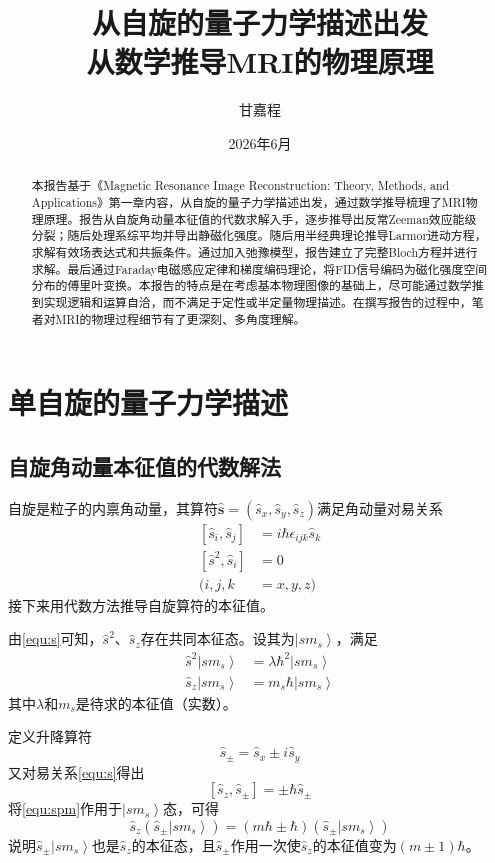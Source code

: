 \documentclass[12pt]{article}
\title{从自旋的量子力学描述出发\\从数学推导MRI的物理原理}
\author{甘嘉程}
\date{2026年6月}
\begin{document}
\maketitle

\begin{abstract}
本报告基于《Magnetic Resonance Image Reconstruction: Theory, Methods, and Applications》第一章内容，从自旋的量子力学描述出发，通过数学推导梳理了MRI物理原理。报告从自旋角动量本征值的代数求解入手，逐步推导出反常Zeeman效应能级分裂；随后处理系综平均并导出静磁化强度。随后用半经典理论推导Larmor进动方程，求解有效场表达式和共振条件。通过加入弛豫模型，报告建立了完整Bloch方程并进行求解。最后通过Faraday电磁感应定律和梯度编码理论，将FID信号编码为磁化强度空间分布的傅里叶变换。本报告的特点是在考虑基本物理图像的基础上，尽可能通过数学推到实现逻辑和运算自洽，而不满足于定性或半定量物理描述。在撰写报告的过程中，笔者对MRI的物理过程细节有了更深刻、多角度理解。
\end{abstract}

\section{单自旋的量子力学描述}
\subsection{自旋角动量本征值的代数解法}
自旋是粒子的内禀角动量，其算符$\bm{\hat{s}}=\left(\hat{s}_x,\hat{s}_y,\hat{s}_z\right)$满足角动量对易关系
\begin{align}
    \left[\hat{s}_i,\hat{s}_j\right]&=i\hbar\epsilon_{ijk}\hat{s}_k\\
    \left[\hat{s}^2,\hat{s}_i\right]&=0 \label{equ:s}\\
    (i,j,k&=x,y,z)\nonumber
\end{align}
接下来用代数方法推导自旋算符的本征值。

由\autoref{equ:s}可知，$\hat{s}^2$、$\hat{s}_z$存在共同本征态。设其为$\left|sm_s\right\rangle$，满足
\begin{align}
    \hat{s}^2\left|sm_s\right\rangle&=\lambda\hbar^2\left|sm_s\right\rangle\\
    \hat{s}_z\left|sm_s\right\rangle&=m_s\hbar\left|sm_s\right\rangle
\end{align}
其中$\lambda$和$m_s$是待求的本征值（实数）。

定义升降算符
\begin{equation}
    \hat{s}_\pm=\hat{s}_x\pm i\hat{s}_y
\end{equation}
又对易关系\autoref{equ:s}得出
\begin{equation}
    \left[\hat{s}_z,\hat{s}_\pm\right]=\pm\hbar\hat{s}_\pm
    \label{equ:spm}
\end{equation}
将\autoref{equ:spm}作用于$\left|sm_s\right\rangle$态，可得
\begin{equation}
    \hat{s}_z\left(\hat{s}_\pm\left|sm_s\right\rangle\right)=(m\hbar\pm \hbar)\left(\hat{s}_\pm\left|sm_s\right\rangle\right)
\end{equation}
说明$\hat{s}_\pm\left|sm_s\right\rangle$也是$\hat{s}_z$的本征态，且$\hat{s}_\pm$作用一次使$\hat{s}_z$的本征值变为$(m\pm1)\hbar$。
\end{document}
